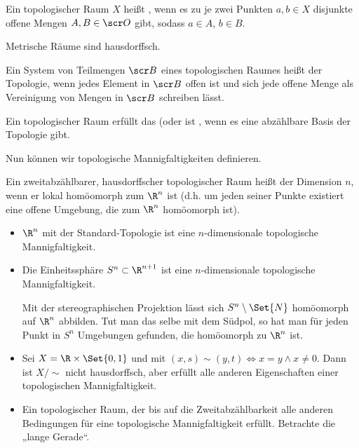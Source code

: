 \begin{df} \label{1.2} %
    Ein topologischer Raum $X$ heißt , wenn es zu je zwei Punkten $a, b \in X$ disjunkte offene Mengen $A, B \in \scr O$ gibt, sodass $a \in A$, $b \in B$.
    \begin{note}
        Metrische Räume sind hausdorffsch.
    \end{note}
\end{df}

\begin{df} \label{1.3} %
    Ein System von Teilmengen $\scr B$ eines topologischen Raumes heißt  der Topologie, wenn jedes Element in $\scr B$ offen ist und sich jede offene Menge als Vereinigung von Mengen in $\scr B$ schreiben lässt.

    Ein topologischer Raum erfüllt das  (oder ist , wenn es eine abzählbare Basis der Topologie gibt.
\end{df}

Nun können wir topologische Mannigfaltigkeiten definieren.

\begin{df} \label{1.4} %
    Ein zweitabzählbarer, hausdorffscher topologischer Raum heißt  der Dimension $n$, wenn
    er lokal homöomorph zum $\R^n$ ist (d.h. um jeden seiner Punkte existiert eine offene Umgebung, die zum $\R^n$ homöomorph ist).
\end{df}

\begin{ex*}
    \begin{itemize}
        \item
            $\R^n$ mit der Standard-Topologie ist eine $n$-dimensionale topologische Mannigfaltigkeit.
        \item
            Die Einheitssphäre $S^n \subset \R^{n+1}$ ist eine $n$-dimensionale topologische Mannigfaltigkeit.

            Mit der stereographischen Projektion lässt sich $S^n \setminus \Set{N}$ homöomorph auf $\R^n$ abbilden.
            Tut man das selbe mit dem Südpol, so hat man für jeden Punkt in $S^n$ Umgebungen gefunden, die homöomorph zu $\R^n$ ist.
        \item
            Sei $X = \R \times \Set{0, 1}$ und mit $(x,s) \sim (y, t) \iff x = y \land x \neq 0$.
            Dann ist $X / \sim$ nicht hausdorffsch, aber erfüllt alle anderen Eigenschaften einer topologischen Mannigfaltigkeit.
        \item

            Ein topologischer Raum, der bis auf die Zweitabzählbarkeit alle anderen Bedingungen für eine topologische Mannigfaltigkeit erfüllt.
            Betrachte die „lange Gerade“.
    \end{itemize}
\end{ex*}


